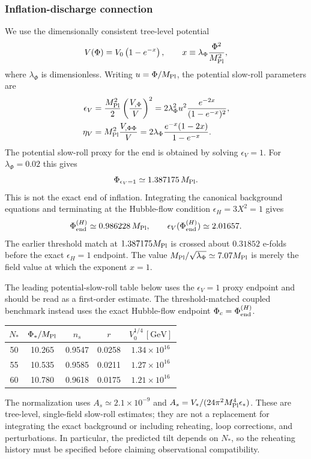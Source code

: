 \documentclass[epj]{svjour}
\begin{document}
\subsubsection{Inflation-discharge connection}
\label{sec:inflation_discharge}

We use the dimensionally consistent tree-level potential
\begin{equation}
V(\Phi)=V_0\left(1-e^{-x}\right),
\qquad
x\equiv\lambda_\Phi\frac{\Phi^2}{M_{\rm Pl}^2},
\end{equation}
where \(\lambda_\Phi\) is dimensionless. Writing
\(u=\Phi/M_{\rm Pl}\), the potential slow-roll parameters are
\begin{align}
\epsilon_V
&=\frac{M_{\rm Pl}^2}{2}
\left(\frac{V_{,\Phi}}{V}\right)^2
=2\lambda_\Phi^2u^2
\frac{e^{-2x}}{(1-e^{-x})^2},\\
\eta_V
&=M_{\rm Pl}^2\frac{V_{,\Phi\Phi}}{V}
=2\lambda_\Phi
\frac{e^{-x}(1-2x)}{1-e^{-x}}.
\end{align}
The potential slow-roll proxy for the end is obtained by solving
$\epsilon_V=1$. For $\lambda_\Phi=0.02$ this gives
\begin{equation}
\Phi_{\epsilon_V=1}\simeq1.387175\,M_{\rm Pl}.
\end{equation}
This is not the exact end of inflation. Integrating the canonical
background equations and terminating at the Hubble-flow condition
$\epsilon_H=3X^2=1$ gives
\begin{equation}
\Phi_{\rm end}^{(H)}\simeq0.986228\,M_{\rm Pl},
\qquad
\epsilon_V(\Phi_{\rm end}^{(H)})\simeq2.01657.
\end{equation}
The earlier threshold match at $1.387175M_{\rm Pl}$ is crossed about
$0.31852$ e-folds before the exact $\epsilon_H=1$ endpoint. The
value $M_{\rm Pl}/\sqrt{\lambda_\Phi}\simeq7.07M_{\rm Pl}$ is merely
the field value at which the exponent $x=1$.

The leading potential-slow-roll table below uses the
$\epsilon_V=1$ proxy endpoint and should be read as a first-order
estimate. The threshold-matched coupled benchmark instead uses the
exact Hubble-flow endpoint $\Phi_c=\Phi_{\rm end}^{(H)}$.
\begin{center}
\begin{tabular}{c|c|c|c|c}
\(N_*\) & \(\Phi_*/M_{\rm Pl}\) & \(n_s\) & \(r\) &
\(V_0^{1/4}\,[\mathrm{GeV}]\)\\
\hline
50 & 10.265 & 0.9547 & 0.0258 & \(1.34\times10^{16}\)\\
55 & 10.535 & 0.9585 & 0.0211 & \(1.27\times10^{16}\)\\
60 & 10.780 & 0.9618 & 0.0175 & \(1.21\times10^{16}\)
\end{tabular}
\end{center}
The normalization uses \(A_s\simeq2.1\times10^{-9}\) and
\(A_s=V_*/(24\pi^2M_{\rm Pl}^4\epsilon_*)\). These are tree-level,
single-field slow-roll estimates; they are not a replacement for
integrating the exact background or including reheating, loop
corrections, and perturbations. In particular, the predicted tilt
depends on \(N_*\), so the reheating history must be specified before
claiming observational compatibility.
\end{document}

